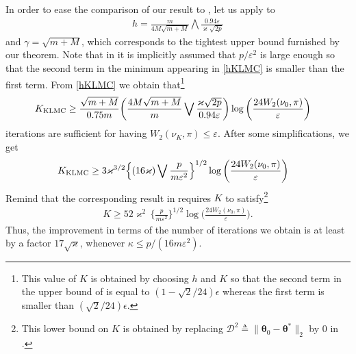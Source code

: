 \documentclass[a4paper,bej,preprint,reqno]{imsart}
\newcommand\btheta{\boldsymbol\theta}
\begin{document}
In order to ease the comparison of our result to \citep[Theorem 1]{Cheng2},
let us apply  to
\begin{align}\label{hKLMC}
h = \frac{m}{4M\sqrt{m+M}}\bigwedge \frac{0.94\varepsilon}{\varkappa\sqrt{2p}}
\end{align}
and  $\gamma = \sqrt{m+M}$, which corresponds to the tightest upper bound
furnished by our theorem. Note that in \citep{Cheng2} it is implicitly assumed that
$p/\varepsilon^2$ is large enough so that the second term in the minimum appearing
in \eqref{hKLMC} is smaller than the first term.
From \eqref{hKLMC} we obtain that\footnote{This value of $K$ is obtained by
choosing $h$ and $K$ so that the second term in the upper bound of  is
equal to $(1-\sqrt{2}/24)\epsilon$ whereas the first term is smaller than
$(\sqrt{2}/24)\epsilon$.}
\begin{align}\label{KKLMC}
K_{\rm KLMC}  &\ge \frac{\sqrt{m+M}}{0.75m} \bigg(\frac{4M\sqrt{m+M}}{m}\bigvee
\frac{\varkappa\sqrt{2p}}{0.94\varepsilon}\bigg) \log\bigg(\frac{24W_2(\nu_0,\pi)}{\varepsilon}\bigg)
\end{align}
iterations are sufficient for having $W_2(\nu_K,\pi)\le \varepsilon$. After some
simplifications, we get
\begin{align}
K_{\rm KLMC}  &\ge 3\varkappa^{3/2} \Big\{(16\varkappa)\bigvee
\frac{p}{m\varepsilon^2}\Big\}^{1/2} \log\bigg(\frac{24W_2(\nu_0,\pi)}{\varepsilon}\bigg)
\label{Keps}
\end{align}
Remind that
the corresponding result in \cite{Cheng2} requires $K$ to satisfy\footnote{This lower bound on $K$ is obtained by replacing
$\mathcal D^2\triangleq\|\btheta_0-\btheta^*\|_2$ by 0 in \citep[Theorem 1]{Cheng2}.}
\begin{align}
K\ge 52\varkappa^2\,\Big\{\frac{p}{m\varepsilon^2}\Big\}^{1/2} \log\bigg(\frac{24W_2(\nu_0,\pi)}{\varepsilon}\bigg).
\end{align}
Thus, the improvement in terms of the number of iterations
we obtain is at least by a factor $17\sqrt{\varkappa}$, whenever 
$\kappa\le p/(16m\varepsilon^2)$.
\end{document}
